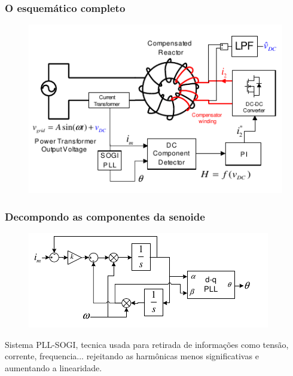 \documentclass{beamer}
\begin{document}
\begin{frame}
    \frametitle{O esquemático completo}

    \begin{figure}
        \includegraphics[width=.8\linewidth]{fig4.png}
    \end{figure}
\end{frame}

\begin{frame}
    \frametitle{Decompondo as componentes da senoide}

    \begin{figure}
        \includegraphics[width=.8\linewidth]{fig5.png}
    \end{figure}

    Sistema PLL-SOGI, tecnica usada para retirada de informações como tensão, corrente, frequencia... rejeitando as harmônicas menos significativas e aumentando a linearidade.
\end{frame}
\end{document}
